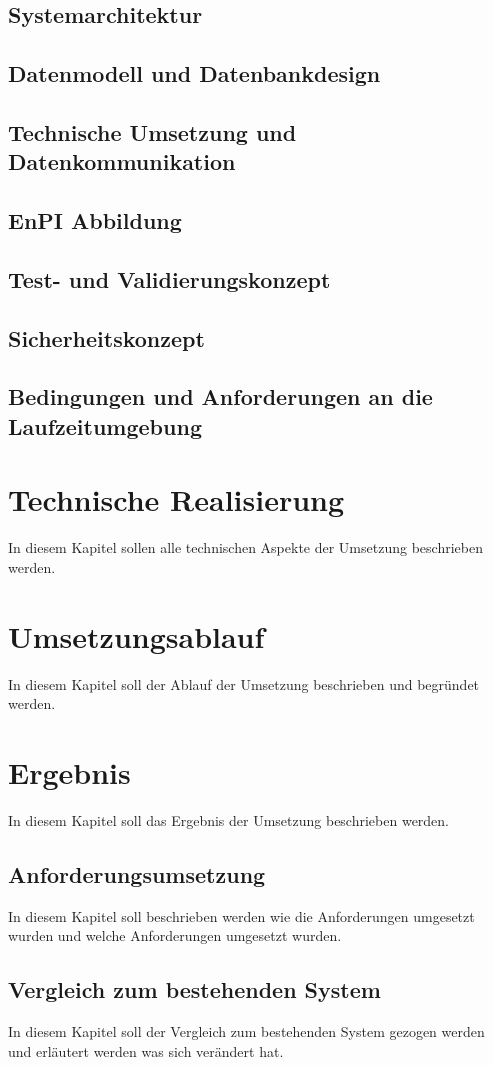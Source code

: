 \documentclass[a4paper,10pt,twoside]{report}
\begin{document}
\subsection{Systemarchitektur}
\subsection{Datenmodell und Datenbankdesign}
\subsection{Technische Umsetzung und Datenkommunikation}
\subsection{EnPI Abbildung}
\subsection{Test- und Validierungskonzept}
\subsection{Sicherheitskonzept}
\subsection{Bedingungen und Anforderungen an die Laufzeitumgebung}

\section{Technische Realisierung}
In diesem Kapitel sollen alle technischen Aspekte der Umsetzung beschrieben werden.
\section{Umsetzungsablauf}
In diesem Kapitel soll der Ablauf der Umsetzung beschrieben und begründet werden.
\section{Ergebnis}
In diesem Kapitel soll das Ergebnis der Umsetzung beschrieben werden.
\subsection{Anforderungsumsetzung}
In diesem Kapitel soll beschrieben werden wie die Anforderungen umgesetzt wurden und welche Anforderungen umgesetzt wurden.
\subsection{Vergleich zum bestehenden System}
In diesem Kapitel soll der Vergleich zum bestehenden System gezogen werden und erläutert werden was sich verändert hat.
\end{document}
